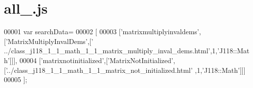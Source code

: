\hypertarget{all__0_8js_source}{}\section{all\+\_.\+js}
\label{all__0_8js_source}

\begin{DoxyCode}
00001 var searchData=
00002 [
00003   [\textcolor{stringliteral}{'matrixmultiplyinvaldems'},[\textcolor{stringliteral}{'MatrixMultiplyInvalDems'},[\textcolor{stringliteral}{'
      ../class\_j118\_1\_1\_math\_1\_1\_matrix\_multiply\_inval\_dems.html'},1,\textcolor{stringliteral}{'J118::Math'}]]],
00004   [\textcolor{stringliteral}{'matrixnotinitialized'},[\textcolor{stringliteral}{'MatrixNotInitialized'},[\textcolor{stringliteral}{'../class\_j118\_1\_1\_math\_1\_1\_matrix\_not\_initialized.html'}
      ,1,\textcolor{stringliteral}{'J118::Math'}]]]
00005 ];
\end{DoxyCode}
